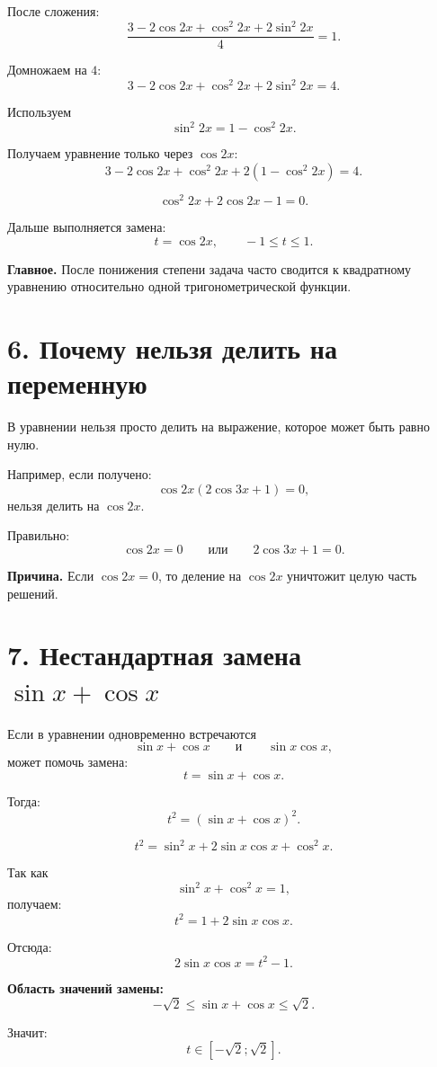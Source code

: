\documentclass[a4paper,12pt]{article}
\newcommand{\sectionline}{\vspace{2mm}{\color{linegray}\hrule height 0.5pt}\vspace{2mm}}
\newcommand{\important}[1]{\textcolor{darkaccent}{\textbf{#1}}}
\begin{document}
После сложения:
\[
\frac{3-2\cos 2x+\cos^2 2x+2\sin^2 2x}{4}=1.
\]

Домножаем на $4$:
\[
3-2\cos 2x+\cos^2 2x+2\sin^2 2x=4.
\]

Используем
\[
\sin^2 2x=1-\cos^2 2x.
\]

Получаем уравнение только через $\cos 2x$:
\[
3-2\cos 2x+\cos^2 2x+2(1-\cos^2 2x)=4.
\]

\[
\cos^2 2x+2\cos 2x-1=0.
\]

Дальше выполняется замена:
\[
t=\cos 2x,\qquad -1\le t\le1.
\]

\important{Главное.} После понижения степени задача часто сводится к квадратному уравнению относительно одной тригонометрической функции.

\sectionline

\section*{\textcolor{darkaccent}{6. Почему нельзя делить на переменную}}

В уравнении нельзя просто делить на выражение, которое может быть равно нулю.

Например, если получено:
\[
\cos 2x(2\cos 3x+1)=0,
\]
нельзя делить на $\cos 2x$.

Правильно:
\[
\cos 2x=0
\qquad\text{или}\qquad
2\cos 3x+1=0.
\]

\important{Причина.} Если $\cos 2x=0$, то деление на $\cos 2x$ уничтожит целую часть решений.

\sectionline

\section*{\textcolor{darkaccent}{7. Нестандартная замена \texorpdfstring{$\sin x+\cos x$}{sin x + cos x}}}

Если в уравнении одновременно встречаются
\[
\sin x+\cos x
\qquad\text{и}\qquad
\sin x\cos x,
\]
может помочь замена:
\[
t=\sin x+\cos x.
\]

Тогда:
\[
t^2=(\sin x+\cos x)^2.
\]

\[
t^2=\sin^2 x+2\sin x\cos x+\cos^2 x.
\]

Так как
\[
\sin^2 x+\cos^2 x=1,
\]
получаем:
\[
t^2=1+2\sin x\cos x.
\]

Отсюда:
\[
2\sin x\cos x=t^2-1.
\]

\important{Область значений замены:}
\[
-\sqrt2\le \sin x+\cos x\le \sqrt2.
\]

Значит:
\[
t\in[-\sqrt2;\sqrt2].
\]
\end{document}
